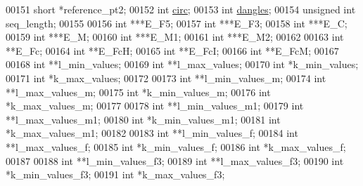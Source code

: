 \begin{DoxyCode}
00151   \textcolor{keywordtype}{short}                 *reference\_pt2;
00152   \textcolor{keywordtype}{int}                   \hyperlink{group__model__details_gaf9202a1a09f5828dc731e2d9a10fa111}{circ};
00153   \textcolor{keywordtype}{int}                   \hyperlink{group__model__details_ga72b511ed1201f7e23ec437e468790d74}{dangles};
00154   \textcolor{keywordtype}{unsigned} \textcolor{keywordtype}{int}          seq\_length;
00155 
00156   \textcolor{keywordtype}{int}                   ***E\_F5;
00157   \textcolor{keywordtype}{int}                   ***E\_F3;
00158   \textcolor{keywordtype}{int}                   ***E\_C;
00159   \textcolor{keywordtype}{int}                   ***E\_M;
00160   \textcolor{keywordtype}{int}                   ***E\_M1;
00161   \textcolor{keywordtype}{int}                   ***E\_M2;
00162 
00163   \textcolor{keywordtype}{int}                   **E\_Fc;
00164   \textcolor{keywordtype}{int}                   **E\_FcH;
00165   \textcolor{keywordtype}{int}                   **E\_FcI;
00166   \textcolor{keywordtype}{int}                   **E\_FcM;
00167 
00168   \textcolor{keywordtype}{int}                   **l\_min\_values;
00169   \textcolor{keywordtype}{int}                   **l\_max\_values;
00170   \textcolor{keywordtype}{int}                   *k\_min\_values;
00171   \textcolor{keywordtype}{int}                   *k\_max\_values;
00172 
00173   \textcolor{keywordtype}{int}                   **l\_min\_values\_m;
00174   \textcolor{keywordtype}{int}                   **l\_max\_values\_m;
00175   \textcolor{keywordtype}{int}                   *k\_min\_values\_m;
00176   \textcolor{keywordtype}{int}                   *k\_max\_values\_m;
00177 
00178   \textcolor{keywordtype}{int}                   **l\_min\_values\_m1;
00179   \textcolor{keywordtype}{int}                   **l\_max\_values\_m1;
00180   \textcolor{keywordtype}{int}                   *k\_min\_values\_m1;
00181   \textcolor{keywordtype}{int}                   *k\_max\_values\_m1;
00182 
00183   \textcolor{keywordtype}{int}                   **l\_min\_values\_f;
00184   \textcolor{keywordtype}{int}                   **l\_max\_values\_f;
00185   \textcolor{keywordtype}{int}                   *k\_min\_values\_f;
00186   \textcolor{keywordtype}{int}                   *k\_max\_values\_f;
00187 
00188   \textcolor{keywordtype}{int}                   **l\_min\_values\_f3;
00189   \textcolor{keywordtype}{int}                   **l\_max\_values\_f3;
00190   \textcolor{keywordtype}{int}                   *k\_min\_values\_f3;
00191   \textcolor{keywordtype}{int}                   *k\_max\_values\_f3;

\end{DoxyCode}
